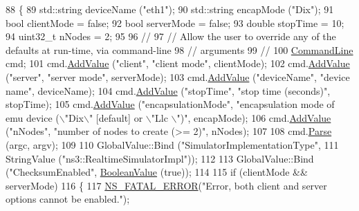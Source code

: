 \begin{DoxyCode}
88 \{
89   std::string deviceName (\textcolor{stringliteral}{"eth1"});
90   std::string encapMode (\textcolor{stringliteral}{"Dix"});
91   \textcolor{keywordtype}{bool} clientMode = \textcolor{keyword}{false};
92   \textcolor{keywordtype}{bool} serverMode = \textcolor{keyword}{false};
93   \textcolor{keywordtype}{double} stopTime = 10;
94   uint32\_t nNodes = 2;
95 
96   \textcolor{comment}{//}
97   \textcolor{comment}{// Allow the user to override any of the defaults at run-time, via command-line}
98   \textcolor{comment}{// arguments}
99   \textcolor{comment}{//}
100   \hyperlink{classns3_1_1CommandLine}{CommandLine} cmd;
101   cmd.\hyperlink{classns3_1_1CommandLine_addcfb546c7ad4c8bd0965654d55beb8e}{AddValue} (\textcolor{stringliteral}{"client"}, \textcolor{stringliteral}{"client mode"}, clientMode);
102   cmd.\hyperlink{classns3_1_1CommandLine_addcfb546c7ad4c8bd0965654d55beb8e}{AddValue} (\textcolor{stringliteral}{"server"}, \textcolor{stringliteral}{"server mode"}, serverMode);
103   cmd.\hyperlink{classns3_1_1CommandLine_addcfb546c7ad4c8bd0965654d55beb8e}{AddValue} (\textcolor{stringliteral}{"deviceName"}, \textcolor{stringliteral}{"device name"}, deviceName);
104   cmd.\hyperlink{classns3_1_1CommandLine_addcfb546c7ad4c8bd0965654d55beb8e}{AddValue} (\textcolor{stringliteral}{"stopTime"}, \textcolor{stringliteral}{"stop time (seconds)"}, stopTime);
105   cmd.\hyperlink{classns3_1_1CommandLine_addcfb546c7ad4c8bd0965654d55beb8e}{AddValue} (\textcolor{stringliteral}{"encapsulationMode"}, \textcolor{stringliteral}{"encapsulation mode of emu device (\(\backslash\)"Dix\(\backslash\)" [default] or \(\backslash\)"Llc
      \(\backslash\)")"}, encapMode);
106   cmd.\hyperlink{classns3_1_1CommandLine_addcfb546c7ad4c8bd0965654d55beb8e}{AddValue} (\textcolor{stringliteral}{"nNodes"}, \textcolor{stringliteral}{"number of nodes to create (>= 2)"}, nNodes);
107 
108   cmd.\hyperlink{classns3_1_1CommandLine_a5c10b85b3207e5ecb48d907966923156}{Parse} (argc, argv);
109 
110   GlobalValue::Bind (\textcolor{stringliteral}{"SimulatorImplementationType"},
111                      StringValue (\textcolor{stringliteral}{"ns3::RealtimeSimulatorImpl"}));
112 
113   GlobalValue::Bind (\textcolor{stringliteral}{"ChecksumEnabled"}, \hyperlink{classns3_1_1BooleanValue}{BooleanValue} (\textcolor{keyword}{true}));
114 
115   \textcolor{keywordflow}{if} (clientMode && serverMode)
116     \{
117       \hyperlink{group__fatal_ga5131d5e3f75d7d4cbfd706ac456fdc85}{NS\_FATAL\_ERROR}(\textcolor{stringliteral}{"Error, both client and server options cannot be enabled."});

\end{DoxyCode}
